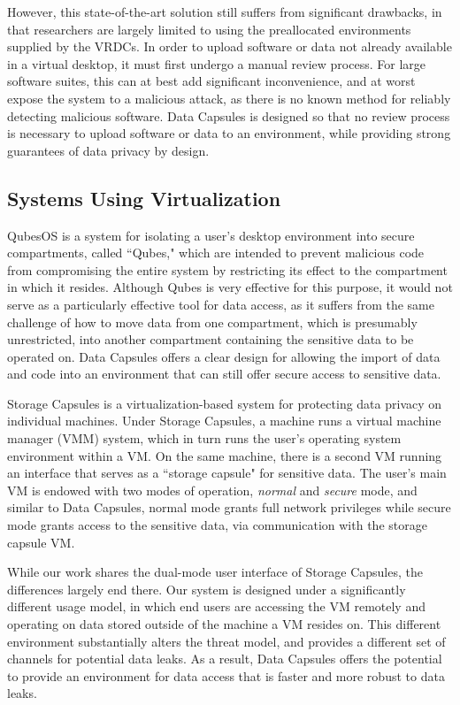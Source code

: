 \documentclass{acm_proc_article-sp}
\begin{document}
However, this state-of-the-art solution still suffers from significant
drawbacks, in that researchers are largely limited to using the preallocated
environments supplied by the VRDCs.  In order to upload software or data not
already available in a virtual desktop, it must first undergo a manual review
process.  For large software suites, this can at best add significant
inconvenience, and at worst expose the system to a malicious attack, as there
is no known method for reliably detecting malicious software.  Data Capsules is
designed so that no review process is necessary to upload software or data to
an environment, while providing strong guarantees of data privacy by design.

\subsection{Systems Using Virtualization}

QubesOS \cite{qubes} is a system for isolating a user's desktop environment
into secure compartments, called ``Qubes," which are intended to prevent
malicious code from compromising the entire system by restricting its effect to
the compartment in which it resides.  Although Qubes is very effective for this
purpose, it would not serve as a particularly effective tool for data access,
as it suffers from the same challenge of how to move data from one compartment,
which is presumably unrestricted, into another compartment containing the
sensitive data to be operated on.  Data Capsules offers a clear design for
allowing the import of data and code into an environment that can still offer
secure access to sensitive data.

Storage Capsules \cite{capsules-borders} is a virtualization-based system for
protecting data privacy on individual machines.  Under Storage Capsules, a
machine runs a virtual machine manager (VMM) system, which in turn runs the
user's operating system environment within a VM.  On the same machine, there is
a second VM running an interface that serves as a ``storage capsule" for
sensitive data.  The user's main VM is endowed with two modes of operation,
\emph{normal} and \emph{secure} mode, and similar to Data Capsules, normal mode
grants full network privileges while secure mode grants access to the sensitive
data, via communication with the storage capsule VM.

While our work shares the dual-mode user interface of Storage Capsules, the
differences largely end there.  Our system is designed under a significantly
different usage model, in which end users are accessing the VM remotely and
operating on data stored outside of the machine a VM resides on. This different
environment substantially alters the threat model, and provides a different set
of channels for potential data leaks.  As a result, Data Capsules offers the
potential to provide an environment for data access that is faster and more
robust to data leaks.
\end{document}
